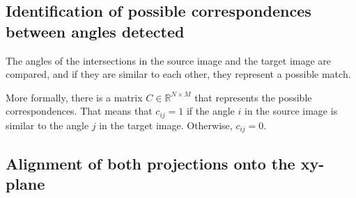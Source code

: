         \subsection{Identification of possible correspondences between angles detected}
            The angles of the intersections in the source image and the target image are compared,
            and if they are similar to each other, they represent a possible match.

            More formally, there is a matrix $C \in \mathbb{R}^{N \times M}$ that represents the possible correspondences.
            That means that $c_{ij} = 1$ if the angle $i$ in the source image is similar to the angle $j$ in the target image.
            Otherwise, $c_{ij} = 0$.

        \subsection{Alignment of both projections onto the xy-plane}
            \label{sub:Alignment of both projections onto the xy-plane}


